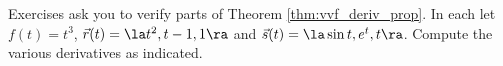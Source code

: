 {\noindent Exercises}
{ ask you to verify parts of Theorem \ref{thm:vvf_deriv_prop}. In each let $f(t) = t^3$, $\vec r(t) =\la t^2,t-1,1\ra$ and $\vec s(t) = \la \sin t, e^t,t\ra$. Compute the various derivatives as indicated.
}
